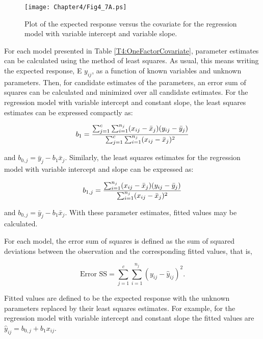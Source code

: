 \begin{figure}[htp]
  \begin{center}
    \texttt{[image: Chapter4/Fig4\_7A.ps]}
    \caption{\label{F4:TheoryVarIntVarSlope} \small  Plot of the expected response versus the covariate for the regression model
with variable intercept and variable slope.}
  \end{center}
\end{figure}

For each model presented in Table \ref{T4:OneFactorCovariate},
parameter estimates can be calculated using the method of least
squares. As usual, this means writing the expected response, E
$y_{ij}$, as a function of known variables and unknown parameters.
Then, for candidate estimates of the parameters, an error sum of
squares can be calculated and minimized over all candidate
estimates. For the regression model with variable intercept and
constant slope, the least squares estimates can be expressed
compactly as:

\begin{equation*}
b_1=\frac{\sum_{j=1}^{c}\sum_{i=1}^{n_{j}}(x_{ij}-\bar{x}_{j})(y_{ij}-\bar{%
y}_{j})}{\sum_{j=1}^{c}\sum_{i=1}^{n_{j}}(x_{ij}-\bar{x}_{j})^{2}}
\end{equation*}

\noindent and $b_{0,j}=\bar{y}_{j}-b_1\bar{x}_{j}$. Similarly, the
least squares estimates for the regression model with variable
intercept and slope can be expressed as:

\begin{equation*}
b_{1,j}=\frac{\sum_{i=1}^{n_{j}}(x_{ij}-\bar{x}_{j})(y_{ij}-\bar{y}_{j})}{%
\sum_{i=1}^{n_{j}}(x_{ij}-\bar{x}_{j})^{2}}
\end{equation*}

\noindent and $b_{0,j}=\bar{y}_{j}-b_1\bar{x}_{j}$. With these
parameter estimates, fitted values may be calculated.

For each model, the error sum of squares is defined as the sum of
squared deviations between the observation and the corresponding
fitted values, that is,

\begin{equation*}
\text{Error
SS}=\sum_{j=1}^{c}\sum_{i=1}^{n_{j}}(y_{ij}-\hat{y}_{ij})^{2}.
\end{equation*}

\noindent Fitted values are defined to be the expected response with
the unknown parameters replaced by their least squares estimates.
For example, for the regression model with variable intercept and
constant slope the fitted values are
$\hat{y}_{ij}=b_{0,j}+b_1x_{ij}$.


